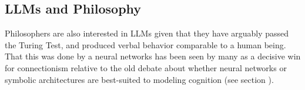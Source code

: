 
\subsection{LLMs and Philosophy}\label{llmPhilosophy}



Philosophers are also interested in LLMs given that they have arguably passed the Turing Test, and produced verbal behavior comparable to a human being. That this was done by a neural networks has  been seen by many as a decisive win for connectionism relative to the old debate about whether neural networks or symbolic architectures are best-suited to modeling cognition (see section ).  

